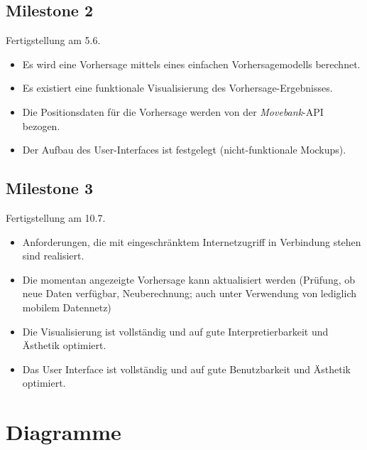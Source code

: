 \documentclass[12pt]{article} %
\begin{document}
\vspace{1em}

\subsection*{Milestone 2}
Fertigstellung am 5.6.
\begin{itemize} 
	\item Es wird eine Vorhersage mittels eines einfachen Vorhersagemodells berechnet.
	\item Es existiert eine funktionale Visualisierung des Vorhersage-Ergebnisses.
	\item Die Positionsdaten für die Vorhersage werden von der \textit{Movebank}-API bezogen.
	\item Der Aufbau des User-Interfaces ist festgelegt (nicht-funktionale Mockups).
\end{itemize}

\vspace{1em}

\subsection*{Milestone 3}
Fertigstellung am 10.7.
\begin{itemize} 
	\item Anforderungen, die mit eingeschränktem Internetzugriff in Verbindung stehen sind realisiert.
	\item Die momentan angezeigte Vorhersage kann aktualisiert werden (Prüfung, ob neue Daten verfügbar, Neuberechnung; auch unter Verwendung von lediglich mobilem Datennetz)
	\item Die Visualisierung ist vollständig und auf gute Interpretierbarkeit und Ästhetik optimiert.
	\item Das User Interface ist vollständig und auf gute Benutzbarkeit und Ästhetik optimiert.
\end{itemize} 



\newpage
\section{Diagramme} \label{diagramme}
\end{document}
